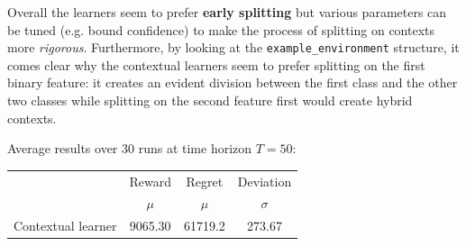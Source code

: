 Overall the learners seem to prefer \textbf{early splitting} but various parameters can be tuned (e.g. bound confidence) to make the process of splitting on contexts more \textit{rigorous}.
Furthermore, by looking at the \texttt{example\_environment} structure, it comes clear why the contextual learners seem to prefer splitting on the first binary feature: it creates an evident division between the first class and the other two classes while splitting on the second feature first would create hybrid contexts.

Average results over 30 runs at time horizon $T = 50$:

\begin{table}[h]
	\center
	\begin{tabular}{|c|cc|c|}
	\hline \hline
		\cellcolor{blue!25} & Reward 	& Regret	& Deviation \\
	\cline{2-4}
		\cellcolor{blue!25} & $\mu$		& $\mu$		& $\sigma$	\\
	\hline \hline
		Contextual learner	& 9065.30	& 61719.2	&  273.67	\\
	\hline \hline
	\end{tabular}
\end{table}
